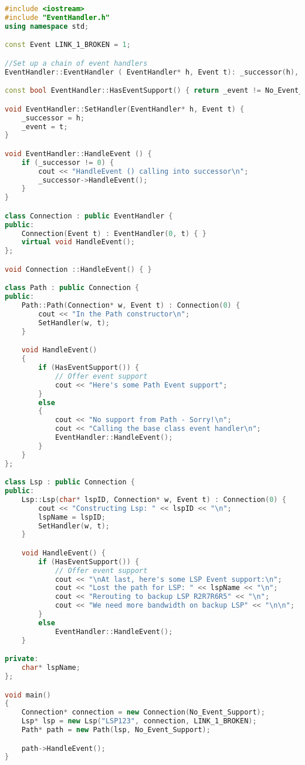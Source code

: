 \documentclass{book}
\begin{document}
\begin{lstlisting}[caption={EventHandler.cpp}, language=C++]
#include <iostream>
#include "EventHandler.h"
using namespace std;

const Event LINK_1_BROKEN = 1;

//Set up a chain of event handlers
EventHandler::EventHandler ( EventHandler* h, Event t): _successor(h), _event(t) { }

const bool EventHandler::HasEventSupport() { return _event != No_Event_Support; }

void EventHandler::SetHandler(EventHandler* h, Event t) {
	_successor = h;
	_event = t;
}

void EventHandler::HandleEvent () {
	if (_successor != 0) {
		cout << "HandleEvent () calling into successor\n";
		_successor->HandleEvent();
	}
}

class Connection : public EventHandler {
public:
	Connection(Event t) : EventHandler(0, t) { }
	virtual void HandleEvent();
};

void Connection ::HandleEvent() { }

class Path : public Connection {
public:
	Path::Path(Connection* w, Event t) : Connection(0) {
		cout << "In the Path constructor\n";
		SetHandler(w, t);
	}

	void HandleEvent()
	{
		if (HasEventSupport()) {
			// Offer event support
			cout << "Here's some Path Event support";
		}
		else
		{
			cout << "No support from Path - Sorry!\n";
			cout << "Calling the base class event handler\n";
			EventHandler::HandleEvent();
		}
	}
};

class Lsp : public Connection {
public:
	Lsp::Lsp(char* lspID, Connection* w, Event t) : Connection(0) {
		cout << "Constructing Lsp: " << lspID << "\n";
		lspName = lspID;
		SetHandler(w, t);
	}

	void HandleEvent() {
		if (HasEventSupport()) {
			// Offer event support
			cout << "\nAt last, here's some LSP Event support:\n";
			cout << "Lost the path for LSP: " << lspName << "\n";
			cout << "Rerouting to backup LSP R2R7R6R5" << "\n";
			cout << "We need more bandwidth on backup LSP" << "\n\n";
		}
		else
			EventHandler::HandleEvent();
	}

private:
	char* lspName;
};

void main()
{
	Connection* connection = new Connection(No_Event_Support);
	Lsp* lsp = new Lsp("LSP123", connection, LINK_1_BROKEN);
	Path* path = new Path(lsp, No_Event_Support);

	path->HandleEvent();
}
\end{lstlisting}
\end{document}

